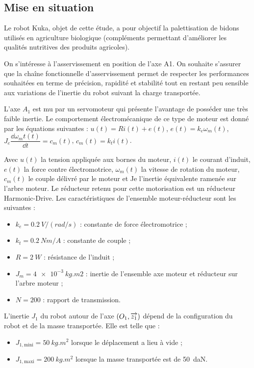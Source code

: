 \documentclass[10pt,fleqn]{article} %
\begin{document}

\vspace{4.5cm}
\pagestyle{fancy}
\thispagestyle{plain}


\def\columnseprulecolor{\color{ocre}}
\setlength{\columnseprule}{0.4pt} 

\begin{multicols}{2}
\section*{Mise en situation}
\ifprof
\else
\fi

Le robot Kuka, objet de cette étude, a pour objectif la palettisation de bidons utilisés en agriculture biologique (compléments permettant d'améliorer les qualités nutritives des produits agricoles).


\begin{obj}
On s’intéresse à l’asservissement en position de l’axe A1. On souhaite s’assurer que la chaîne 
fonctionnelle d’asservissement permet de  respecter  les performances  souhaitées en  terme de 
précision, rapidité et stabilité tout en restant peu sensible aux variations de l’inertie du robot 
suivant la charge transportée. 
\end{obj}

L’axe  $A_1$  est  mu  par  un  servomoteur  qui  présente  l'avantage  de  posséder  une  très  faible inertie. Le comportement électromécanique de ce type de moteur est donné par les équations suivantes : 
$u(t) = Ri(t) + e(t)$, $e(t) =k_e \omega_m(t)$, $J_e \dfrac{\dd \omega_mt(t)}{\dd t}=c_m(t)$, $c_m(t)=k_t i(t)$.

Avec  $u(t)$  la  tension  appliquée  aux  bornes  du moteur,  $i(t)$  le  courant  d’induit,  $e(t)$  la  force 
contre  électromotrice, $\omega_m(t)$  la  vitesse  de  rotation  du moteur,  $c_m(t)$  le  couple  délivré  par  le 
moteur et Je l’inertie équivalente ramenée sur l’arbre moteur. 
Le  réducteur  retenu  pour  cette  motorisation  est  un  réducteur  Harmonic-Drive.  Les 
caractéristiques de l’ensemble moteur-réducteur sont les suivantes : 
\begin{itemize}
\item $k_e = \SI{0,2}{V/(rad/s)}$ : constante de force électromotrice ; 
\item $k_t = \SI{0,2}{Nm/A}$ : constante de couple ; 
\item $R = \SI{2}{W}$ : résistance de l’induit ; 
\item $J_m = \SI{4e-3}{kg.m2}$ : inertie de l’ensemble axe moteur et réducteur sur l'arbre moteur ; 
\item $N = 200$ : rapport de transmission.
\end{itemize} 
L’inertie $J_1$ du robot autour de l’axe $\left(O_1,\overrightarrow{z_1}\right)$ dépend de la configuration du robot et de la masse 
transportée. Elle est telle que : 
\begin{itemize}
\item $J_{1,\text{mini}} = \SI{50}{kg.m^2}$ lorsque le déplacement a lieu à vide ; 
\item $J_{1,\text{maxi}} = \SI{200}{kg.m^2}$ lorsque la masse transportée est de \SI{50}{daN}.
\end{itemize}


\end{multicols}
\end{document}
